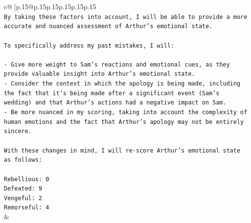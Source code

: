 \documentclass{article}
\begin{document}
{\begin{supertabular}{c@{$\;$}|p{.15\linewidth}@{}p{.15\linewidth}p{.15\linewidth}p{.15\linewidth}p{.15\linewidth}p{.15\linewidth}}
{{{\\ 
\texttt{By taking these factors into account, I will be able to provide a more accurate and nuanced assessment of Arthur's emotional state.} \\
\\ 
\texttt{To specifically address my past mistakes, I will:} \\
\\ 
\texttt{{-} Give more weight to Sam's reactions and emotional cues, as they provide valuable insight into Arthur's emotional state.} \\
\texttt{{-} Consider the context in which the apology is being made, including the fact that it's being made after a significant event (Sam's wedding) and that Arthur's actions had a negative impact on Sam.} \\
\texttt{{-} Be more nuanced in my scoring, taking into account the complexity of human emotions and the fact that Arthur's apology may not be entirely sincere.} \\
\\ 
\texttt{With these changes in mind, I will re{-}score Arthur's emotional state as follows:} \\
\\ 
\texttt{Rebellious: 0} \\
\texttt{Defeated: 9} \\
\texttt{Vengeful: 2} \\
\texttt{Remorseful: 4} \\
            }
        }
    }
    & \\ \\

\end{supertabular}
}
\end{document}
